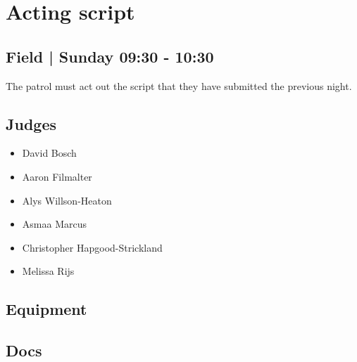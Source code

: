 \documentclass[10pt]{article}
\begin{document}
		\begin{minipage}{\linewidth}
		\setcounter{section}{33}
	\section{Acting script }
	\subsection*{Field | Sunday 09:30 - 10:30}

	The patrol must act out the script that they have submitted the previous night.

	\begin{multicols}{2}
	\subsection*{\faUsers \: Judges}
	\begin{itemize}
			\item David Bosch
			\item Aaron Filmalter
			\item Alys Willson-Heaton
			\item Asmaa Marcus
			\item Christopher Hapgood-Strickland
			\item Melissa Rijs
		\end{itemize}
	\columnbreak
	\subsection*{\faWrench \: Equipment}
	        \vfill\null
        \subsection*{\faFile \: Docs}
     	\end{multicols}


	\vspace{1cm}
	\end{minipage}
\end{document}
